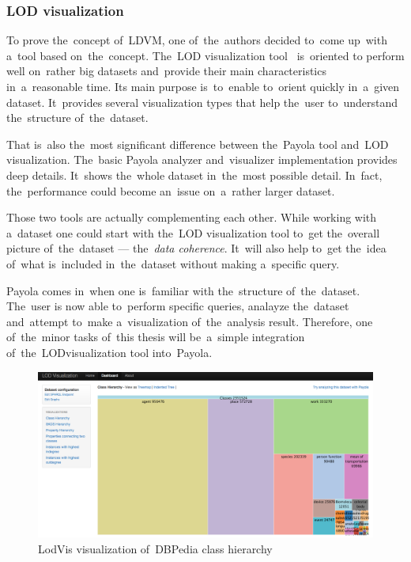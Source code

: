 \subsubsection{LOD visualization}
\label{rw:lodvis}
To prove the~concept of~LDVM, one of~the~authors decided to~come up~with a~tool 
based on~the~concept. The~LOD visualization tool~\cite{lodvis} is~oriented
to perform well on~rather big datasets and~provide their main characteristics in~a~reasonable time. Its main purpose is~to~enable to~orient quickly in~a~given dataset. It~provides several 
visualization types that help the~user to~understand the~structure of~the~dataset.

That is~also the~most significant difference between the~Payola tool and~LOD 
visualization. The~basic Payola analyzer and~visualizer implementation provides 
deep details. It~shows the~whole dataset in~the~most possible detail. In~fact, 
the~performance could become an~issue on~a~rather larger dataset.

Those two tools are actually complementing each other. While working with a~dataset one could 
start with the~LOD visualization tool to~get the~overall picture of~the~dataset --- 
the~\emph{data coherence}. It~will also help to~get the~idea of~what is~included in~the~dataset without making a~specific query.

Payola comes in~when one is~familiar with the~structure of~the~dataset. The~user 
is now able to~perform specific queries, analayze the~dataset and~attempt to~make a~visualization of~the~analysis result. Therefore, one of~the~minor tasks of~this thesis
will be~a~simple integration of~the~LODvisualization tool into~Payola.

\begin{figure}
	\centering
	\includegraphics[width=140mm]{img/lodvis.png}
	\caption{LodVis visualization of~DBPedia class hierarchy}
	\label{fig:lodvis}
\end{figure}

